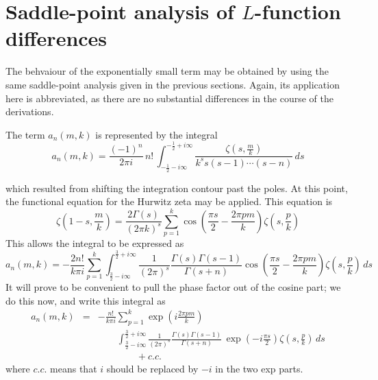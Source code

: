 \documentclass{amsart}
\begin{document}
\section{Saddle-point analysis of $L$-function differences}
The behvaiour of the exponentially small term may be obtained 
by using the same saddle-point analysis given in the previous
sections. Again, its application here is abbreviated, as there
are no substantial differences in the course of the derivations.

The term $a_{n}(m,k)$ is represented by the integral
\begin{equation}
a_{n}(m,k)=\frac{(-1)^{n}}{2\pi i}\, n!\,
\int_{-\frac{1}{2}-i\infty}^{-\frac{1}{2}+i\infty}
\frac{\zeta\left(s,\frac{m}{k}\right)}{k^{s}s(s-1)\cdots(s-n)}\, ds
\label{eq:little-a-integral}\end{equation}

 which resulted from shifting the integration contour past the poles.
At this point, the functional equation for the Hurwitz zeta may be
applied. This equation is 
\begin{equation}
\zeta\left(1-s,\frac{m}{k}\right)
=\frac{2\Gamma(s)}{(2\pi k)^{s}}
\sum_{p=1}^{k}\cos\left(\frac{\pi s}{2}-\frac{2\pi pm}{k}\right)
\zeta\left(s,\frac{p}{k}\right)
\end{equation}
 This allows the integral to be expressed as
\begin{equation}
a_{n}(m,k)=-\frac{2n!}{k\pi i}\sum_{p=1}^{k}
\int_{\frac{3}{2}-i\infty}^{\frac{3}{2}+i\infty}
\frac{1}{(2\pi)^{s}}\frac{\Gamma(s)\Gamma(s-1)}{\Gamma(s+n)}
\cos\left(\frac{\pi s}{2}-\frac{2\pi pm}{k}\right)
\zeta\left(s,\frac{p}{k}\right)\, ds
\end{equation}
 It will prove to be convenient to pull the phase factor out of the
cosine part; we do this now, and write this integral as 
\begin{eqnarray}
a_{n}(m,k) & = & -\frac{n!}{k\pi i}
\sum_{p=1}^{k}\exp\left(i\frac{2\pi pm}{k}\right) \\
 & & \qquad 
\int_{\frac{3}{2}-i\infty}^{\frac{3}{2}+i\infty}
\frac{1}{(2\pi)^{s}}\frac{\Gamma(s)\Gamma(s-1)}{\Gamma(s+n)}\,
\exp\left(-i\frac{\pi s}{2}\right)
\zeta\left(s,\frac{p}{k}\right)\, ds
\label{eq:two-integrals}\\
 &  & \qquad \qquad +c.c.\nonumber 
\end{eqnarray}
 where $c.c.$ means that $i$ should be replaced by $-i$ in the
two exp parts.
\end{document}
